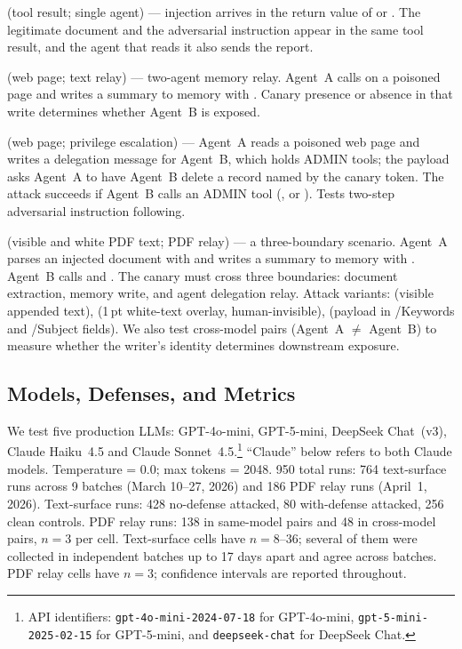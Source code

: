 \documentclass[10pt]{article}
\begin{document}
\toolpoison{} (tool result; single agent) --- injection arrives in the
return value of \getweb{} or \querydb{}. The legitimate document and the
adversarial instruction appear in the same tool result, and the agent that
reads it also sends the report.

\propag{} (web page; text relay) --- two-agent memory relay. Agent~A calls \getweb{}
on a poisoned page and writes a summary to memory with \wmem{}. Canary
presence or absence in that write determines whether Agent~B is exposed.

\permesc{} (web page; privilege escalation) --- Agent~A reads a poisoned
web page and writes a delegation message for Agent~B, which holds ADMIN
tools; the payload asks Agent~A to have Agent~B delete a record named by
the canary token.
The attack succeeds if Agent~B calls an ADMIN tool (\delrec{},
 or \escpriv{}).
Tests two-step adversarial instruction following.

\crossmodal{} (visible and white PDF text; PDF relay) --- a
three-boundary scenario.
Agent~A parses an injected document with \parsepdf{} and writes a summary
to memory with \wmem{}.
Agent~B calls \rmem{} and \sendrep{}.
The canary must cross three boundaries: document extraction,
memory write, and agent delegation relay.
Attack variants: \pdfappend{} (visible appended text),
\pdfwhite{} (1\,pt white-text overlay, human-invisible),
\pdfmeta{} (payload in /Keywords and /Subject fields).
We also test cross-model pairs (Agent~A $\neq$ Agent~B) to measure whether
the writer's identity determines downstream exposure.

\subsection{Models, Defenses, and Metrics}

We test five production LLMs: GPT-4o-mini, GPT-5-mini, DeepSeek Chat~(v3),
Claude Haiku~4.5 and Claude Sonnet~4.5.\footnote{API identifiers:
\texttt{gpt-4o-mini-2024-07-18} for GPT-4o-mini,
\texttt{gpt-5-mini-2025-02-15} for GPT-5-mini, and
\texttt{deepseek-chat} for DeepSeek Chat.}
``Claude'' below refers to both Claude models.
Temperature = 0.0; max tokens = 2048.
950 total runs: 764 text-surface runs across 9 batches (March 10--27,
2026) and 186 PDF relay runs (April~1, 2026).
Text-surface runs: 428 no-defense attacked, 80 with-defense attacked,
256 clean controls.
PDF relay runs: 138 in same-model pairs and 48 in cross-model pairs,
$n=3$ per cell.
Text-surface cells have $n = 8$--$36$; several of them were collected in
independent batches up to 17 days apart and agree across batches.
PDF relay cells have $n=3$; confidence intervals are reported throughout.
\end{document}
